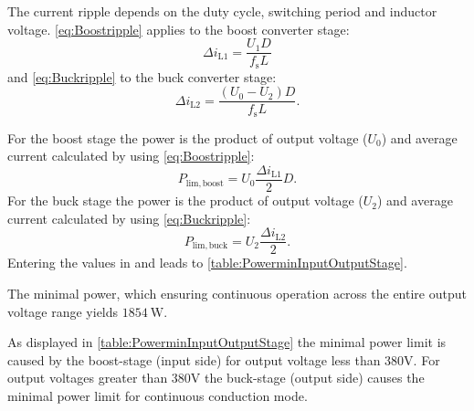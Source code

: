 
\begin{solutionblock}
    The current ripple depends on the duty cycle, switching period and inductor voltage.
    \eqref{eq:Boostripple} applies to the boost converter stage:
    \begin{equation}
        \Delta i_\mathrm{L1}=\frac{U_\mathrm{1}D}{f_\mathrm{s}L}
        \label{eq:Boostripple}
    \end{equation}
    and \eqref{eq:Buckripple} to the buck converter stage:
    \begin{equation}
        \Delta i_\mathrm{L2}=\frac{\left(U_\mathrm{0}-U_\mathrm{2}\right)D}{f_\mathrm{s}L}.
        \label{eq:Buckripple}
    \end{equation}
\end{solutionblock}


\begin{solutionblock}
    For the boost stage the power is the product of output voltage
     ($U_\mathrm{0}$) and average current calculated by using \eqref{eq:Boostripple}:
    \begin{equation}
        P_\mathrm{lim,boost}=U_\mathrm{0}\frac{\Delta i_\mathrm{L1}}{2}D.
    \end{equation}
    For the buck stage the power is the product of output voltage
    ($U_\mathrm{2}$) and average current calculated by using \eqref{eq:Buckripple}:
    \begin{equation}
        P_\mathrm{lim,buck}=U_\mathrm{2}\frac{\Delta i_\mathrm{L2}}{2}.
    \end{equation}
    Entering the values in \label{eq:Boostripple} and \label{eq:Buckripple} leads to \autoref{table:PowerminInputOutputStage}.
    
    The minimal power, which ensuring continuous operation across the entire output voltage range
    yields  $\SI{1854}{\watt}$.
\end{solutionblock}

\begin{solutionblock}
    As displayed in \autoref{table:PowerminInputOutputStage} the minimal power limit is caused by the 
    boost-stage (input side) for output voltage less than 380V. For output voltages greater than 380V 
    the buck-stage (output side) causes the minimal power limit for continuous conduction mode.
\end{solutionblock}

